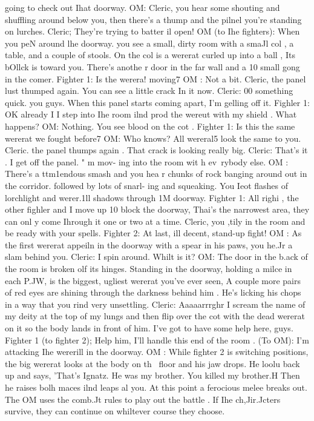 \documentclass[../main.tex]{subfiles}
\begin{document}
\begin{multicols}{3}
		going to check out Ihat doorway.
		OM: Cleric, you hear some shouting and
		shuffling around below you, then there's
		a thump and the pilnel you're standing
		on lurches.
		Cleric; They're trying to batter il open!
		OM (to Ihe fighters): When you peN around
		lhe doorway. you see a small, dirty room
		with a smaJl col , a table, and a couple of
		stools. On the col is a wererat curled up
		into a ball , Its bOllck is toward you.
		There's anothe r door in the far wall and a
		10
		small gong in the comer.
		Fighter 1: Is the werera! moving7
		OM : Not a bit. Cleric, the panel lust
		thumped again. You can see a little crack
		In it now.
		Cleric: 00 something quick. you guys.
		When this panel starts coming apart, I'm
		gelling off it.
		Fighler 1: OK already I I step into Ihe room
		ilnd prod the wereut with my shield .
		What happens?
		OM: Nothing. You see blood on the cot .
		Fighter 1: Is this the same wererat we fought
		before7
		OM: Who knows? All wereral5 look the
		same to you. Cleric. the panel thumps
		again . That crack is looking really big.
		Cleric: That's it . I get off the panel. " m mov-
		ing into the room wit h ev~rybody else.
		OM : There's a ttm1endous smash and you
		hea r chunks of rock banging around out
		in the corridor. followed by lots of snarl-
		ing and squeaking. You Ieot flashes of
		lorchlight and werer.1ll shadows through
		1M doorway.
		Fighter 1: All righi , the other fighler and I
		move up 10 block the doorway, Thai's
		the narrowest area, they can onl y come
		Ihrough it one or two at a time. Cleric,
		you ,tily in the room and be ready with
		your spells.
		Fighter 2: At last, ill decent, stand-up fight!
		OM : As the first wererat appeiln in the
		doorway with a spear in his paws, you
		he.Jr a slam behind you.
		Cleric: I spin around. Whilt is it?
		OM: The door in the b.ack of the room is
		broken olf its hinges. Standing in the
		doorway, holding a milce in each P.JW, is
		the biggest, ugliest wererat you've ever
		seen, A couple more pairs of red eyes are
		shining through the darkness behind
		him . He's licking his chops in a way that
		you rind very unsettling.
		Cleric: Aaaaarrrghr I scream the name of
		my deity at the top of my lungs and then
		flip over the cot with the dead wererat on
		it so the body lands in front of him. I've
		got to have some help here, guys.
		Fighter 1 (to fighter 2); Help him, I'll handle
		this end of the room . (To OM): I'm
		attacking Ihe wererill in the doorway.
		OM : While fighter 2 is switching positions,
		the big wererat looks at the body on th~
		floor and his jaw drops. He loolu back
		up and says, 'That's Ignatz. He was my
		brother. You killed my brother.H Then he
		raises bolh maces ilnd leaps al you.
		At this point a ferocious melee breaks
		out. The OM uses the comb.Jt rules to play
		out the battle . If Ihe ch,Jir.Jcters survive, they
		can continue on whiltever course they
		choose.
	\end{multicols}
\end{document}
